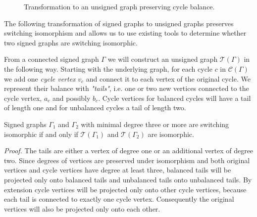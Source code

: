 \begin{figure}[h]
    \caption[Transformation to an unsigned graph preserving cycle balance]{Transformation to an unsigned graph preserving cycle balance.}
\end{figure}

The following transformation of signed graphs to unsigned graphs preserves switching isomorphism and allows us to use existing tools to determine whether two signed graphs are switching isomorphic.

\begin{theorem}\label{th:conversion}
    From a connected signed graph $\Gamma$ we will construct an unsigned graph $\mathcal{T} (\Gamma)$ in the following way. Starting with the underlying graph, for each cycle $c$ in $\mathcal{C} (\Gamma)$ we add one \textit{cycle vertex} $v_c$ and connect it to each vertex of the original cycle. We represent their balance with \textit{"tails"}, i.e. one or two new vertices connected to the cycle vertex, $a_c$ and possibly $b_c$. Cycle vertices for balanced cycles will have a tail of length one and for unbalanced cycles a tail of length two.

    Signed graphs $\Gamma _1$ and $\Gamma _2$ with minimal degree three or more are switching isomorphic if and only if $\mathcal{T} (\Gamma _1)$ and $\mathcal{T} (\Gamma _2)$ are isomorphic.
\end{theorem}

\textit{Proof.} The tails are either a vertex of degree one or an additional vertex of degree two. Since degrees of vertices are preserved under isomorphism and both original vertices and cycle vertices have degree at least three, balanced tails will be projected only onto balanced tails and unbalanced tails onto unbalanced tails. By extension cycle vertices will be projected only onto other cycle vertices, because each tail is connected to exactly one cycle vertex. Consequently the original vertices will also be projected only onto each other.

